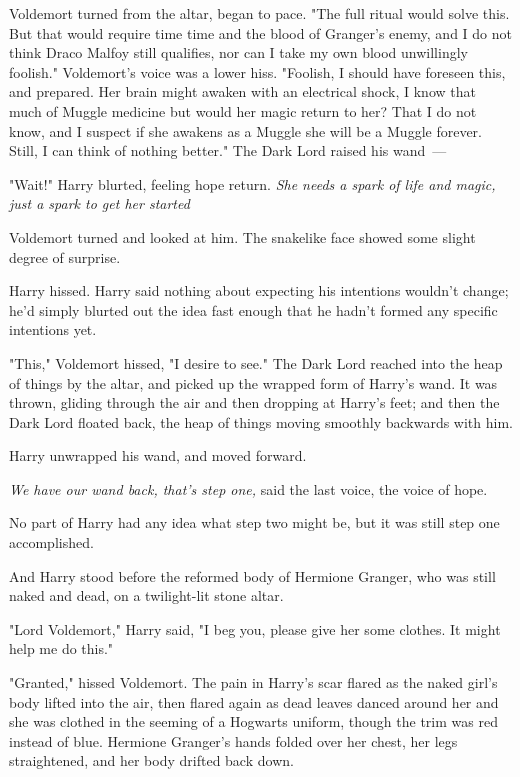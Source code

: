  Voldemort turned from the altar,
began to pace. "The full ritual would solve this. But that would require
time{\el} time and the blood of Granger's enemy, and I do not think Draco
Malfoy still qualifies, nor can I take my own blood unwillingly{\el}
foolish." Voldemort's voice was a lower hiss. "Foolish, I should have foreseen
this, and prepared. Her brain might awaken with an electrical shock, I know
that much of Muggle medicine{\el} but would her magic return to her? That I
do not know, and I suspect if she awakens as a Muggle she will be a Muggle
forever. Still, I can think of nothing better." The Dark Lord raised his wand~---

"Wait!" Harry blurted, feeling hope return. \emph{She needs a spark of life and
magic, just a spark to get her started{\el}}

Voldemort turned and looked at him. The snakelike face showed some slight
degree of surprise.

 Harry hissed.  Harry said nothing about
expecting his intentions wouldn't change; he'd simply blurted out the idea fast
enough that he hadn't formed any specific intentions yet.

"This," Voldemort hissed, "I desire to see." The Dark Lord reached into the
heap of things by the altar, and picked up the wrapped form of Harry's wand. It
was thrown, gliding through the air and then dropping at Harry's feet; and then
the Dark Lord floated back, the heap of things moving smoothly backwards with
him.

Harry unwrapped his wand, and moved forward.

\emph{We have our wand back, that's step one,} said the last voice, the voice
of hope.

No part of Harry had any idea what step two might be, but it was still step one
accomplished.

And Harry stood before the reformed body of Hermione Granger, who was still
naked and dead, on a twilight-lit stone altar.

"Lord Voldemort," Harry said, "I beg you, please give her some clothes. It
might help me do this."

"Granted," hissed Voldemort. The pain in Harry's scar flared as the naked
girl's body lifted into the air, then flared again as dead leaves danced around
her and she was clothed in the seeming of a Hogwarts uniform, though the trim
was red instead of blue. Hermione Granger's hands folded over her chest, her
legs straightened, and her body drifted back down.

